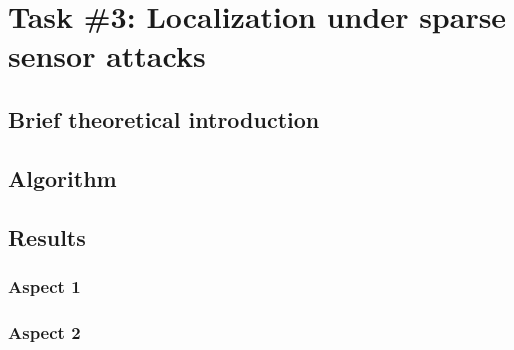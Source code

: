 \section*{Task \#3: Localization under sparse sensor attacks}

\subsection*{Brief theoretical introduction}

\subsection*{Algorithm}

\subsection*{Results}


\subsubsection*{Aspect 1}

\subsubsection*{Aspect 2}
